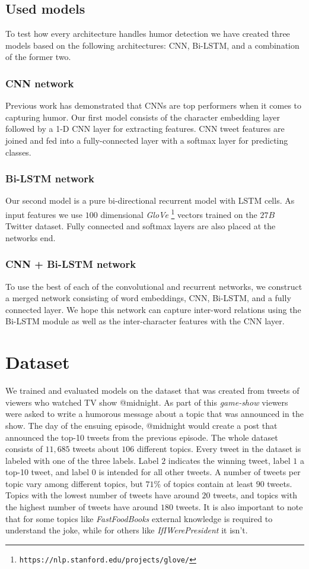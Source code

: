 \documentclass[10pt, a4paper]{article}
\begin{document}
\subsection{Used models}
To test how every architecture handles humor detection we have created three
models based on the following architectures: CNN, Bi-LSTM, and a combination of the former two.

\subsubsection{CNN network}
Previous work \citep{potash2016hashtagwars} has demonstrated that CNNs are top performers
when it comes to capturing humor. Our first model consists of the character
embedding layer followed by a 1-D CNN layer for extracting features. CNN tweet
features are joined and fed into a fully-connected layer with a softmax layer
for predicting classes. 

\subsubsection{Bi-LSTM network}
Our second model is a pure bi-directional recurrent model with LSTM cells. As
input features we use $100$ dimensional \emph{GloVe} \footnote{\texttt{https://nlp.stanford.edu/projects/glove/}} \citep{glove2014} vectors trained on the $27B$
Twitter dataset. Fully connected and softmax layers are also placed at the
networks end.

\subsubsection{CNN + Bi-LSTM network}
To use the best of each of the convolutional and recurrent networks, we
construct a merged network consisting of word embeddings, CNN, Bi-LSTM, and
a fully connected layer. We hope this network can capture inter-word relations
using the Bi-LSTM module as well as the inter-character features with the CNN
layer.

\section{Dataset}
We trained and evaluated models on the dataset that was created
from tweets of viewers who watched TV show @midnight. As part of this
\emph{game-show}
viewers were asked to write a humorous message about a topic that was announced
in the show. The day of the ensuing episode, @midnight would create a post that
announced the top-10 tweets from the previous episode. The whole dataset consists
of $11,685$ tweets about $106$ different topics. Every tweet in the dataset is
labeled with one of the three labels. Label $2$ indicates the winning tweet,
label $1$ a top-10 tweet, and label $0$ is intended for all other
tweets. A number of tweets per topic vary among different topics, but $71\%$ of
topics contain at least $90$ tweets. Topics with the lowest number of tweets have 
around $20$ tweets, and topics with the highest number of tweets have around
$180$ tweets.
It is also important to note that for some topics like \emph{FastFoodBooks} external
knowledge is required to understand the joke, while for others like
\emph{IfIWerePresident} it isn't.
\end{document}
